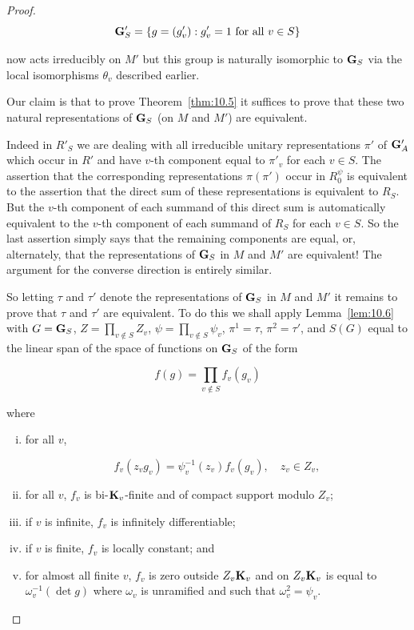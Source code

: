 \begin{proof}
\[
\mathbf{G}'_S = \{g = (g'_v): g'_v = 1 \ \text{for all } v \in S\}
\]

now acts irreducibly on $M'$ but this group is naturally isomorphic to $\mathbf{G}_S$ via the local isomorphisms $\theta_v$ described earlier.

Our claim is that to prove Theorem~\ref{thm:10.5} it suffices to prove that these two natural representations of $\mathbf{G}_S$ (on $M$ and $M'$) are equivalent.

Indeed in $R'_S$ we are dealing with all irreducible unitary representations $\pi'$ of $\mathbf{G}'_A$ which occur in $R'$ and have $v$-th component equal to $\pi'_v$ for each $v \in S$. The assertion that the corresponding representations $\pi(\pi')$ occur in $R^{\psi}_0$ is equivalent to the assertion that the direct sum of these representations is equivalent to $R_S$. But the $v$-th component of each summand of this direct sum is automatically equivalent to the $v$-th component of each summand of $R_S$ for each $v \in S$. So the last assertion simply says that the remaining components are equal, or, alternately, that the representations of $\mathbf{G}_S$ in $M$ and $M'$ are equivalent! The argument for the converse direction is entirely similar.

So letting $\tau$ and $\tau'$ denote the representations of $\mathbf{G}_S$ in $M$ and $M'$ it remains to prove that $\tau$ and $\tau'$ are equivalent. To do this we shall apply Lemma~\ref{lem:10.6} with $G = \mathbf{G}_S$, $Z = \prod_{v \notin S} Z_v$, $\psi = \prod_{v \notin S} \psi_v$, $\pi^1 = \tau$, $\pi^2 = \tau'$, and $S(G)$ equal to the linear span of the space of functions on $\mathbf{G}_S$ of the form

\[
f(g) = \prod_{v \notin S} f_v(g_v)
\]

where

\begin{enumerate}[(i)]

\item for all $v$,

\[
f_v(z_v g_v) = \psi_v^{-1}(z_v)f_v(g_v), \quad z_v \in Z_v,
\]

\item for all $v$, $f_v$ is bi-$\mathbf{K}_v$-finite and of compact support modulo $Z_v$;

\item if $v$ is infinite, $f_v$ is infinitely differentiable;

\item if $v$ is finite, $f_v$ is locally constant; and

\item for almost all finite $v$, $f_v$ is zero outside $Z_v\mathbf{K}_v$ and on $Z_v\mathbf{K}_v$ is equal to $\omega_v^{-1}(\det g)$ where $\omega_v$ is unramified and such that $\omega_v^2 = \psi_v$.


\end{enumerate}
\end{proof}
